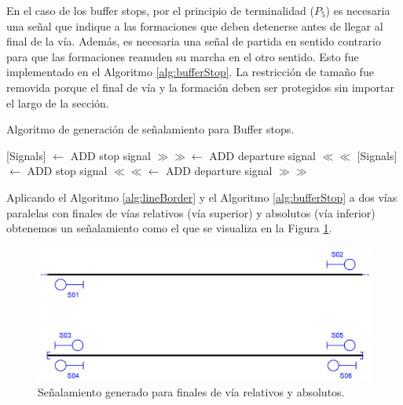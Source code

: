     En el caso de los buffer stops, por el principio de terminalidad ($P_5$) es necesaria una señal que indique a las formaciones que deben detenerse antes de llegar al final de la vía. Además, es necesaria una señal de partida en sentido contrario para que las formaciones reanuden su marcha en el otro sentido. Esto fue implementado en el Algoritmo \ref{alg:bufferStop}. La restricción de tamaño fue removida porque el final de vía y la formación deben ser protegidos sin importar el largo de la sección.
    
    \begin{algorithm}[H]
        \caption{Algoritmo de generación de señalamiento para Buffer stops.}\label{alg:bufferStop}
        \DontPrintSemicolon
        \SetNoFillComment
        \LinesNotNumbered 
        {
            {
                [Signals] $\gets$ ADD stop signal $\gg\gg$\;
                [Signals] $\gets$ ADD departure signal $\ll\ll$\;
            }
            {
                [Signals] $\gets$ ADD stop signal $\ll\ll$\;
                [Signals] $\gets$ ADD departure signal $\gg\gg$\;
            }
        }
        \KwResult{[Signals]} 
    \end{algorithm}
    
    Aplicando el Algoritmo \ref{alg:lineBorder} y el Algoritmo \ref{alg:bufferStop} a dos vías paralelas con finales de vías relativos (vía superior) y absolutos (vía inferior) obtenemos un señalamiento como el que se visualiza en la Figura \ref{fig:signal_border}.
    
    \begin{figure}[H]
        \centering
        \includegraphics[width=1\textwidth]{Figuras/limites.PNG}
        \centering\caption{Señalamiento generado para finales de vía relativos y absolutos.}
        \label{fig:signal_border}
    \end{figure}
    

